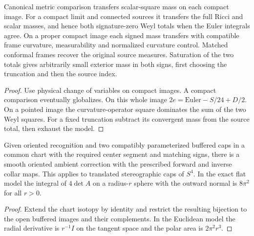 \begin{proposition}
\label{prop:ed48-transfer}
\leanok
Canonical metric comparison transfers scalar-square mass on each compact
image. For a compact limit and connected sources it transfers the full
Ricci and scalar masses, and hence both signature-zero Weyl totals when the
Euler integrals agree. On a proper compact image each signed mass transfers
with compatible frame curvature, measurability and normalized curvature
control. Matched conformal frames recover the original source measures.
Saturation of the two totals gives arbitrarily small exterior mass in
both signs, first choosing the truncation and then the source index.
\end{proposition}
\begin{proof}
\leanok
Use physical change of variables on compact images. A compact comparison
eventually globalizes. On this whole image $2e=\mathrm{Euler}-S/24+D/2$.
On a pointed image the curvature-operator square dominates the sum of the
two Weyl squares. For a fixed truncation subtract its convergent mass
from the source total, then exhaust the model.
\end{proof}

\begin{proposition}
\label{prop:ed48-cap}
\leanok
Given oriented recognition and two compatibly parameterized buffered caps
in a common chart with the required center segment and matching signs,
there is a smooth oriented ambient correction with the prescribed forward
and inverse collar maps. This applies to translated stereographic caps
of $S^4$. In the exact flat model the integral of $4\det A$ on a
radius-$r$ sphere with the outward normal is $8\pi^2$ for all $r>0$.
\end{proposition}
\begin{proof}
\leanok
Extend the chart isotopy by identity and restrict the resulting bijection
to the open buffered images and their complements. In the Euclidean model
the radial derivative is $r^{-1}I$ on the tangent space and the polar
area is $2\pi^2r^3$.
\end{proof}

